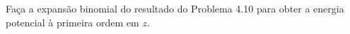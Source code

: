 Faça a expansão binomial do resultado do Problema 4.10 para obter a energia potencial à primeira ordem em $z$.

